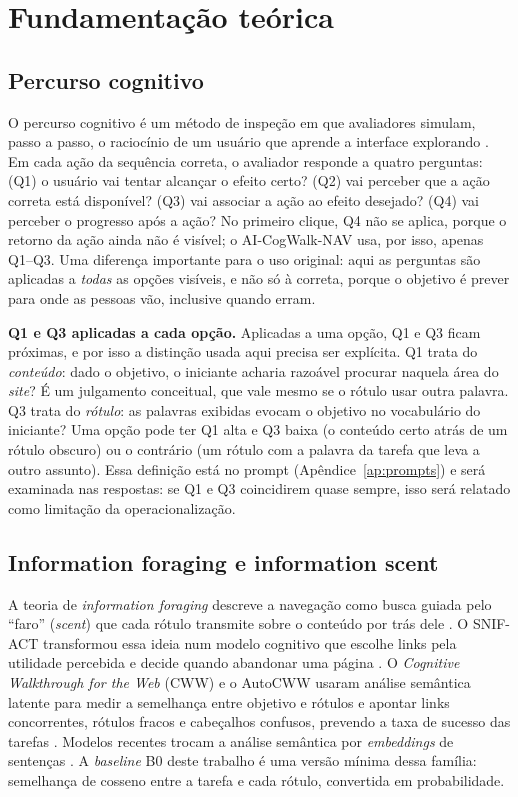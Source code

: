 \documentclass[12pt]{article}
\newcommand{\proj}{AI-CogWalk-NAV}
\begin{document}
\section{Fundamentação teórica}
\label{sec:fundamentacao}

\subsection{Percurso cognitivo}
O percurso cognitivo é um método de inspeção em que avaliadores simulam, passo a passo, o raciocínio de um usuário que aprende a interface explorando \cite{polson1992cw,wharton1994cw}. Em cada ação da sequência correta, o avaliador responde a quatro perguntas: (Q1) o usuário vai tentar alcançar o efeito certo? (Q2) vai perceber que a ação correta está disponível? (Q3) vai associar a ação ao efeito desejado? (Q4) vai perceber o progresso após a ação? No primeiro clique, Q4 não se aplica, porque o retorno da ação ainda não é visível; o \proj{} usa, por isso, apenas Q1--Q3. Uma diferença importante para o uso original: aqui as perguntas são aplicadas a \emph{todas} as opções visíveis, e não só à correta, porque o objetivo é prever para onde as pessoas vão, inclusive quando erram.

\textbf{Q1 e Q3 aplicadas a cada opção.} Aplicadas a uma opção, Q1 e Q3 ficam próximas, e por isso a distinção usada aqui precisa ser explícita. Q1 trata do \emph{conteúdo}: dado o objetivo, o iniciante acharia razoável procurar naquela área do \textit{site}? É um julgamento conceitual, que vale mesmo se o rótulo usar outra palavra. Q3 trata do \emph{rótulo}: as palavras exibidas evocam o objetivo no vocabulário do iniciante? Uma opção pode ter Q1 alta e Q3 baixa (o conteúdo certo atrás de um rótulo obscuro) ou o contrário (um rótulo com a palavra da tarefa que leva a outro assunto). Essa definição está no prompt (Apêndice~\ref{ap:prompts}) e será examinada nas respostas: se Q1 e Q3 coincidirem quase sempre, isso será relatado como limitação da operacionalização.

\subsection{Information foraging e information scent}
A teoria de \textit{information foraging} descreve a navegação como busca guiada pelo ``faro'' (\textit{scent}) que cada rótulo transmite sobre o conteúdo por trás dele \cite{pirolli1999foraging}. O SNIF-ACT transformou essa ideia num modelo cognitivo que escolhe links pela utilidade percebida e decide quando abandonar uma página \cite{fu2007snifact}. O \textit{Cognitive Walkthrough for the Web} (CWW) e o AutoCWW usaram análise semântica latente para medir a semelhança entre objetivo e rótulos e apontar links concorrentes, rótulos fracos e cabeçalhos confusos, prevendo a taxa de sucesso das tarefas \cite{blackmon2002cww,blackmon2005autocww}. Modelos recentes trocam a análise semântica por \textit{embeddings} de sentenças \cite{reimers2019sbert,jin2026scent}. A \textit{baseline} B0 deste trabalho é uma versão mínima dessa família: semelhança de cosseno entre a tarefa e cada rótulo, convertida em probabilidade.
\end{document}
